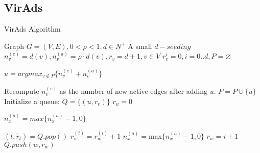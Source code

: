\subsection{VirAds} 
\begin{algorithm}
	\caption{VirAds Algorithm}
	\begin{algorithmic}[1]
		
		\Require Graph $G = (V,E),0<\rho<1,d\in N^{+}$
		\Ensure A small $d-seeding$ 
		\State $n_{v}^{(e)} = d(v),n_{v}^{(a)} = \rho \cdot d(v), r_{v}  = d + 1, v \in V $
		\State $r_{v}^{i}=0, i=0..d, P  = \varnothing $
		
		\Repeat
		\State $u  = argmax_{v\not\in P}\{n_{v}^{(e)}+n_{v}^{(a)}\}$ 
		
		Recompute $n_{v}^{(e)}$ as the number of new active edges after adding $u$.
		\State $P  = P \cup \{u\} $
		\State Initialize a queue: $Q  = \{(u,r_{v})\} $
		\State $r_u = 0 $
		
		\State $n_{x}^{(a)}  = max\{n_{x}^{(a)}-1,0\} $
		
		\EndFor
		\State$(t,\widetilde{r_{t}})  = Q.pop() $
		\State $r_{w}^{(i)}=r_{w}^{(i)}+1 $
		\State $n_{x}^{(a)} =$max$\{n_{x}^{(a)}-1,0\} $	
		\EndFor
		\State $r_{w}=i+1 $
		\State $Q.push(w,r_{w}) $	
		\EndIf
		\EndIf
		\EndFor
		\EndFor
		\EndWhile
		\EndWhile
	\end{algorithmic}
\end{algorithm}
